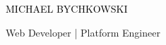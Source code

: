 \documentclass[9pt]{resume} %
\begin{document}

\begin{center}
	\HUGE\textcolor{black}{\MakeUppercase{Michael Bychkowski}} %
			
	{\huge Web Developer | Platform Engineer} %
\end{center}

\noindent\makebox[\linewidth]{\rule{\paperwidth}{1.6pt}} \\

\end{document}
